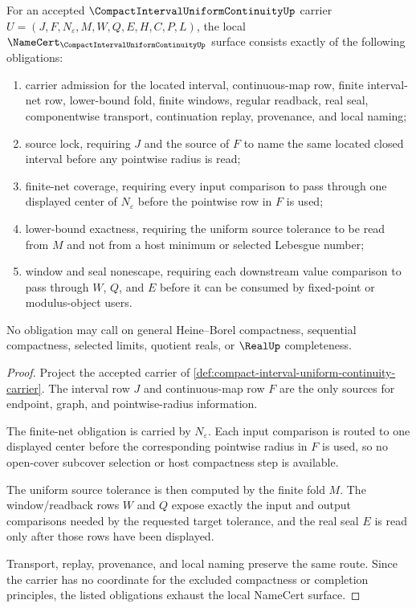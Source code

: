 \begin{theorem}
\label{thm:compact-interval-uniform-continuity-namecert-obligations}
For an accepted $\CompactIntervalUniformContinuityUp$ carrier
$U=(J,F,N_\varepsilon,M,W,Q,E,H,C,P,L)$, the local
$\NameCert_{\CompactIntervalUniformContinuityUp}$ surface consists exactly of
the following obligations:
\begin{enumerate}
\item carrier admission for the located interval, continuous-map row, finite
interval-net row, lower-bound fold, finite windows, regular readback, real
seal, componentwise transport, continuation replay, provenance, and local
naming;
\item source lock, requiring $J$ and the source of $F$ to name the same
located closed interval before any pointwise radius is read;
\item finite-net coverage, requiring every input comparison to pass through
one displayed center of $N_\varepsilon$ before the pointwise row in $F$ is
used;
\item lower-bound exactness, requiring the uniform source tolerance to be read
from $M$ and not from a host minimum or selected Lebesgue number;
\item window and seal nonescape, requiring each downstream value comparison to
pass through $W$, $Q$, and $E$ before it can be consumed by fixed-point or
modulus-object users.
\end{enumerate}
No obligation may call on general Heine--Borel compactness, sequential
compactness, selected limits, quotient reals, or $\RealUp$ completeness.
\end{theorem}
\begin{proof}
Project the accepted carrier of
\autoref{def:compact-interval-uniform-continuity-carrier}. The interval row
$J$ and continuous-map row $F$ are the only sources for endpoint, graph, and
pointwise-radius information.

The finite-net obligation is carried by $N_\varepsilon$. Each input comparison
is routed to one displayed center before the corresponding pointwise radius in
$F$ is used, so no open-cover subcover selection or host compactness step is
available.

The uniform source tolerance is then computed by the finite fold $M$. The
window/readback rows $W$ and $Q$ expose exactly the input and output
comparisons needed by the requested target tolerance, and the real seal $E$ is
read only after those rows have been displayed.

Transport, replay, provenance, and local naming preserve the same route. Since
the carrier has no coordinate for the excluded compactness or completion
principles, the listed obligations exhaust the local NameCert surface.
\end{proof}

